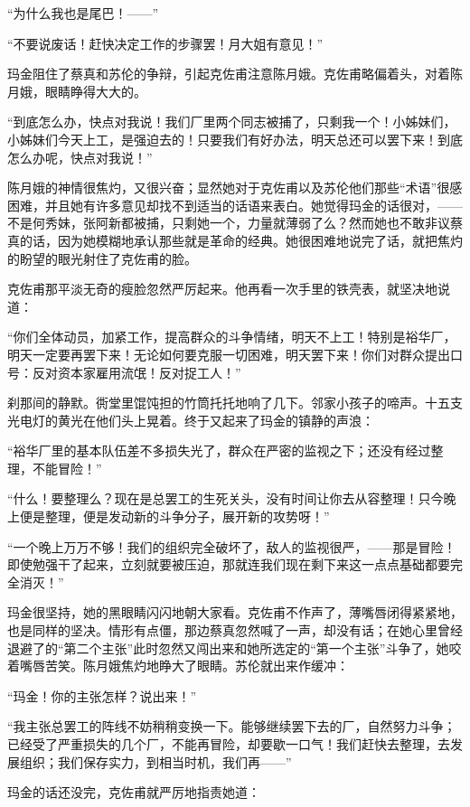 \par “为什么我也是尾巴！——”
\par “不要说废话！赶快决定工作的步骤罢！月大姐有意见！”
\par 玛金阻住了蔡真和苏伦的争辩，引起克佐甫注意陈月娥。克佐甫略偏着头，对着陈月娥，眼睛睁得大大的。
\par “到底怎么办，快点对我说！我们厂里两个同志被捕了，只剩我一个！小姊妹们，小姊妹们今天上工，是强迫去的！只要我们有好办法，明天总还可以罢下来！到底怎么办呢，快点对我说！”
\par 陈月娥的神情很焦灼，又很兴奋；显然她对于克佐甫以及苏伦他们那些“术语”很感困难，并且她有许多意见却找不到适当的话语来表白。她觉得玛金的话很对，——不是何秀妹，张阿新都被捕，只剩她一个，力量就薄弱了么？然而她也不敢非议蔡真的话，因为她模糊地承认那些就是革命的经典。她很困难地说完了话，就把焦灼的盼望的眼光射住了克佐甫的脸。
\par 克佐甫那平淡无奇的瘦脸忽然严厉起来。他再看一次手里的铁壳表，就坚决地说道：
\par “你们全体动员，加紧工作，提高群众的斗争情绪，明天不上工！特别是裕华厂，明天一定要再罢下来！无论如何要克服一切困难，明天罢下来！你们对群众提出口号：反对资本家雇用流氓！反对捉工人！”
\par 刹那间的静默。衖堂里馄饨担的竹筒托托地响了几下。邻家小孩子的啼声。十五支光电灯的黄光在他们头上晃着。终于又起来了玛金的镇静的声浪：
\par “裕华厂里的基本队伍差不多损失光了，群众在严密的监视之下；还没有经过整理，不能冒险！”
\par “什么！要整理么？现在是总罢工的生死关头，没有时间让你去从容整理！只今晚上便是整理，便是发动新的斗争分子，展开新的攻势呀！”
\par “一个晚上万万不够！我们的组织完全破坏了，敌人的监视很严，——那是冒险！即使勉强干了起来，立刻就要被压迫，那就连我们现在剩下来这一点点基础都要完全消灭！”
\par 玛金很坚持，她的黑眼睛闪闪地朝大家看。克佐甫不作声了，薄嘴唇闭得紧紧地，也是同样的坚决。情形有点僵，那边蔡真忽然喊了一声，却没有话；在她心里曾经退避了的“第二个主张”此时忽然又闯出来和她所选定的“第一个主张”斗争了，她咬着嘴唇苦笑。陈月娥焦灼地睁大了眼睛。苏伦就出来作缓冲：
\par “玛金！你的主张怎样？说出来！”
\par “我主张总罢工的阵线不妨稍稍变换一下。能够继续罢下去的厂，自然努力斗争；已经受了严重损失的几个厂，不能再冒险，却要歇一口气！我们赶快去整理，去发展组织；我们保存实力，到相当时机，我们再——”
\par 玛金的话还没完，克佐甫就严厉地指责她道：

